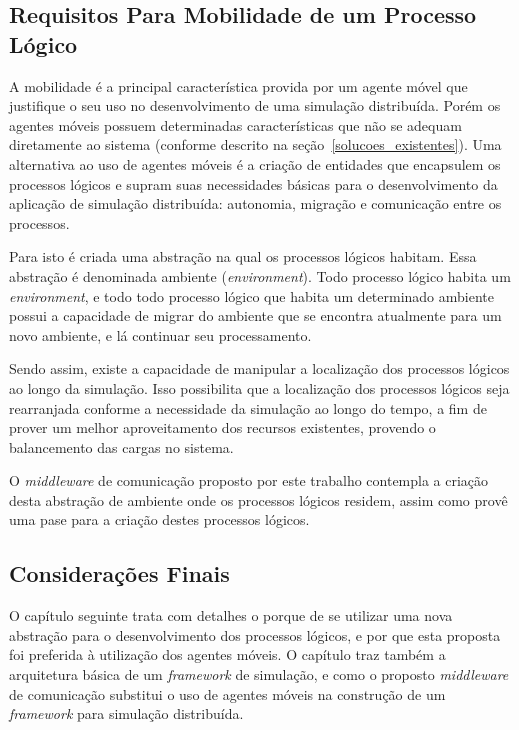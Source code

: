 \subsection{Requisitos Para Mobilidade de um Processo Lógico}

A mobilidade é a principal característica provida por um agente móvel que justifique o seu uso no desenvolvimento de uma simulação distribuída. Porém os agentes móveis possuem determinadas características que não se adequam diretamente ao sistema (conforme descrito na seção~\ref{solucoes_existentes}). Uma alternativa ao uso de agentes móveis é a criação de entidades que encapsulem os processos lógicos e supram suas necessidades básicas para o desenvolvimento da aplicação de simulação distribuída: autonomia, migração e comunicação entre os processos.

Para isto é criada uma abstração na qual os processos lógicos habitam. Essa abstração é denominada ambiente (\textit{environment}). Todo processo lógico habita um \textit{environment}, e todo todo processo lógico que habita um determinado ambiente possui a capacidade de migrar do ambiente que se encontra atualmente para um novo ambiente, e lá continuar seu processamento.

Sendo assim, existe a capacidade de manipular a localização dos processos lógicos ao longo da simulação. Isso possibilita que a localização dos processos lógicos seja rearranjada conforme a necessidade da simulação ao longo do tempo, a fim de prover um melhor aproveitamento dos recursos existentes, provendo o balancemento das cargas no sistema.

O \textit{middleware} de comunicação proposto por este trabalho contempla a criação desta abstração de ambiente onde os processos lógicos residem, assim como provê uma pase para a criação destes processos lógicos.

\subsection{Considerações Finais}

O capítulo seguinte trata com detalhes o porque de se utilizar uma nova abstração para o desenvolvimento dos processos lógicos, e por que esta proposta foi preferida à utilização dos agentes móveis. O capítulo traz também a arquitetura básica de um \textit{framework} de simulação, e como o proposto \textit{middleware} de comunicação substitui o uso de agentes móveis na construção de um \textit{framework} para simulação distribuída.
